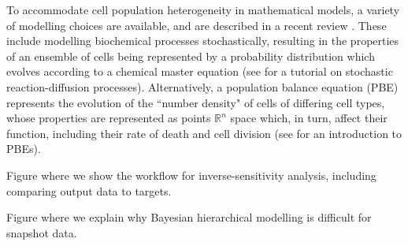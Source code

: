 \documentclass[10pt,letterpaper]{article}
\begin{document}
To accommodate cell population heterogeneity in mathematical models, a variety of modelling choices are available, and are described in a recent review \cite{waldherr2018estimation}. These include modelling biochemical processes stochastically, resulting in the properties of an ensemble of cells being represented by a probability distribution which evolves according to a chemical master equation (see \cite{erban2007practical} for a tutorial on stochastic reaction-diffusion processes). Alternatively, a population balance equation (PBE) represents the evolution of the ``number density" of cells of differing cell types, whose properties are represented as points $\mathbb{R}^n$ space which, in turn, affect their function, including their rate of death and cell division (see \cite{ramkrishna2014population} for an introduction to PBEs).

Figure where we show the workflow for inverse-sensitivity analysis, including comparing output data to targets.

Figure where we explain why Bayesian hierarchical modelling is difficult for snapshot data.





\linenumbers
\end{document}

